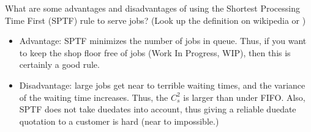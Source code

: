 \begin{question}
  What are some advantages and disadvantages of using the Shortest
  Processing Time First (SPTF) rule to serve jobs? (Look up the
  definition on wikipedia or
  \citet{hall91:_queuein_method_servic_manuf})
  \begin{solution}
  \begin{itemize}
  \item Advantage: SPTF minimizes the number of jobs in queue. Thus,
    if you want to keep the shop floor free of jobs (Work In Progress,
    WIP), then this is certainly a good rule. 
  \item Disadvantage: large jobs get near to terrible waiting times,
    and the variance of the waiting time increases. Thus, the $C_s^2$
    is larger than under FIFO. Also, SPTF does not take duedates into
    account, thus giving a reliable duedate quotation to a customer is
    hard (near to impossible.)
  \end{itemize}
  \end{solution}
\end{question}


